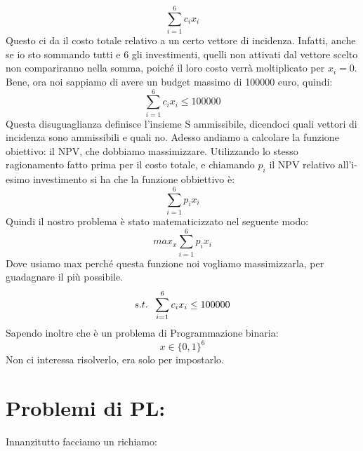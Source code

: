 \begin{equation*}
    \sum_{i=1}^6 c_ix_i 
\end{equation*}
Questo ci da il costo totale relativo a un certo vettore di incidenza. Infatti, anche se io sto sommando tutti e 6 gli investimenti, quelli non attivati dal vettore scelto non compariranno nella somma, poiché il loro costo verrà moltiplicato per $x_i = 0$. Bene, ora noi sappiamo di avere un budget massimo di 100000 euro, quindi:
\begin{equation*}
    \sum_{i=1}^6 c_ix_i \leq 100000
\end{equation*}
Questa disuguaglianza definisce l'insieme S ammissibile, dicendoci quali vettori di incidenza sono ammissibili e quali no. Adesso andiamo a calcolare la funzione obiettivo: il NPV, che dobbiamo massimizzare. Utilizzando lo stesso ragionamento fatto prima per il costo totale, e chiamando $p_i$ il NPV relativo all'i-esimo investimento si ha che la funzione obbiettivo è:
\begin{equation*}
    \sum_{i=1}^6 p_ix_i 
\end{equation*}
Quindi il nostro problema è stato matematicizzato nel seguente modo:
\begin{equation*}
    max_x \sum_{i=1}^6 p_ix_i
\end{equation*}
Dove usiamo max perché questa funzione noi vogliamo massimizzarla, per guadagnare il più possibile.
\begin{equation*}
    s.t. \hspace{0.2cm} \sum_{i=1}^6 c_ix_i \leq 100000
\end{equation*}
Sapendo inoltre che è un problema di Programmazione binaria:
\begin{equation*}
    x \in \{0,1\}^6
\end{equation*}
Non ci interessa risolverlo, era solo per impostarlo.


\section{Problemi di PL:} 
Innanzitutto facciamo un richiamo:
